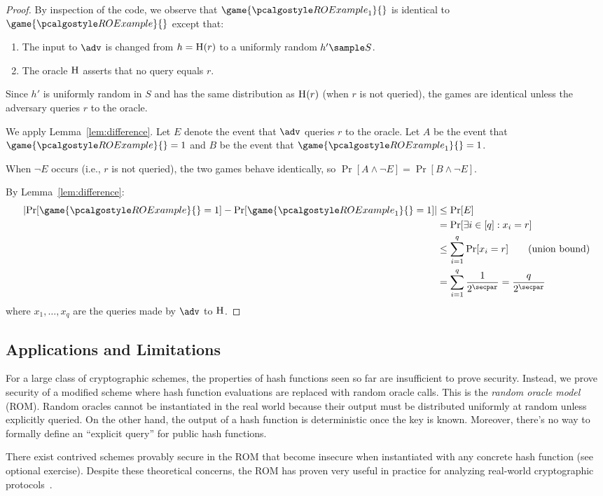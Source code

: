 \begin{proof}
  By inspection of the code, we observe that $\game{\algo{ROExample}_1}{}$ is identical to $\game{\algo{ROExample}}{}$ except that:
  \begin{enumerate}
  \item The input to $\adv$ is changed from $h = {\normalfont\textsc{H}}(r)$ to a uniformly random $h' \sample S$.
  \item The oracle ${\normalfont\textsc{H}}$ asserts that no query equals $r$.
  \end{enumerate}
  
  Since $h'$ is uniformly random in $S$ and has the same distribution as ${\normalfont\textsc{H}}(r)$ (when $r$ is not queried), the games are identical unless the adversary queries $r$ to the oracle.
  
  We apply Lemma~\ref{lem:difference}. Let $E$ denote the event that $\adv$ queries $r$ to the oracle. Let $A$ be the event that $\game{\algo{ROExample}}{} = 1$ and $B$ be the event that $\game{\algo{ROExample}_1}{} = 1$. 
  
  When $\neg E$ occurs (i.e., $r$ is not queried), the two games behave identically, so $\Pr[A \wedge \neg E] = \Pr[B \wedge \neg E]$. 
  
  By Lemma~\ref{lem:difference}:
  \begin{align*}
    \left|\Pr[\game{\algo{ROExample}}{} = 1] - \Pr[\game{\algo{ROExample}_1}{} = 1]\right| &\leq \Pr[E] \\
    &= \Pr[\exists i \in [q] : x_i = r] \\
    &\leq \sum_{i=1}^q \Pr[x_i = r] \tag{union bound} \\
    &= \sum_{i=1}^q \frac{1}{2^\secpar} = \frac{q}{2^\secpar}
  \end{align*}
  where $x_1, \ldots, x_q$ are the queries made by $\adv$ to ${\normalfont\textsc{H}}$.
\end{proof}

\subsection{Applications and Limitations}

\begin{remark}
  For a large class of cryptographic schemes, the properties of hash functions seen so far are insufficient to prove security.
  Instead, we prove security of a modified scheme where hash function evaluations are replaced with random oracle calls.
  This is the \emph{random oracle model} (ROM).
  Random oracles cannot be instantiated in the real world because their output must be distributed uniformly at random unless explicitly queried.
  On the other hand, the output of a hash function is deterministic once the key is known.
  Moreover, there's no way to formally define an ``explicit query'' for public hash functions.

  There exist contrived schemes provably secure in the ROM that become insecure when instantiated with any concrete hash function (see optional exercise).
  Despite these theoretical concerns, the ROM has proven very useful in practice for analyzing real-world cryptographic protocols~\cite{BR93}.
\end{remark}

